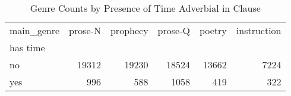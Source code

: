 \begin{table}[htbp!]
\centering
\caption{Genre Counts by Presence of Time Adverbial in Clause}
\label{table:allcl_genre_ct}
\begin{tabular}{lrrrrr}
\toprule
main\_genre &  prose-N &  prophecy &  prose-Q &  poetry &  instruction \\
has time &          &           &          &         &              \\
\midrule
no       &    19312 &     19230 &    18524 &   13662 &         7224 \\
yes      &      996 &       588 &     1058 &     419 &          322 \\
\bottomrule
\end{tabular}
\end{table}
